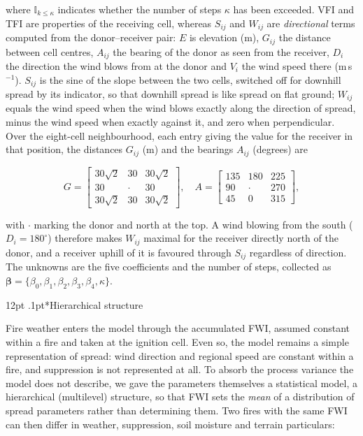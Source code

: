 \documentclass[ResearchPaper,linenum]{CSIRO_LaTeX_Template}
\makeatletter
\renewcommand\subsubsection{\@startsection{subsubsection}{3}{\z@}%
  {12pt \@plus 1pt \@minus 1pt}{.1pt}{\subsubsectionfont}}
\makeatother
\begin{document}
\noindent where $\mathbb{I}_{k \le \kappa}$ indicates whether the number of steps
$\kappa$ has been exceeded. VFI and TFI are properties of the receiving cell, whereas
$S_{ij}$ and $W_{ij}$ are \textit{directional} terms computed from the donor--receiver
pair: $E$ is elevation (m), $G_{ij}$ the distance between cell centres, $A_{ij}$ the
bearing of the donor as seen from the receiver, $D_i$ the direction the wind blows from
at the donor
and $V_i$ the wind speed there (m\,s$^{-1}$). $S_{ij}$ is the sine of the slope between
the two cells, switched off for downhill spread by its indicator, so that downhill
spread is like spread on flat ground; $W_{ij}$ equals the wind speed when the wind blows
exactly along the direction of spread, minus the wind speed when exactly against it,
and zero when perpendicular. Over the eight-cell neighbourhood, each entry giving the
value for the receiver in that position, the distances $G_{ij}$ (m) and the bearings
$A_{ij}$ (degrees) are

\[
    G =
    \begin{bmatrix}
        30 \sqrt{2} & 30 & 30 \sqrt{2} \\
        30 & \cdot & 30 \\
        30 \sqrt{2} & 30 & 30 \sqrt{2}
    \end{bmatrix}, \quad
    A =
    \begin{bmatrix}
        135 & 180 & 225 \\
        90 & \cdot & 270 \\
        45 & 0 & 315
    \end{bmatrix},
\]

\noindent with $\cdot$ marking the donor and north at the top. A wind blowing from the
south ($D_i = 180^\circ$) therefore makes $W_{ij}$ maximal for the receiver directly
north of the donor, and a receiver uphill of it is favoured through $S_{ij}$ regardless
of direction. The unknowns are the five coefficients and the number of steps, collected as
$\boldsymbol{\beta} = \{\beta_0, \beta_1, \beta_2, \beta_3, \beta_4, \kappa\}$.

\subsubsection*{Hierarchical structure}

Fire weather enters the model through the accumulated FWI, assumed constant within a
fire and taken at the ignition cell. Even so, the model remains a simple representation
of spread: wind direction and regional speed are constant within a fire, and
suppression is not represented at all.
To absorb the process variance the model does not describe, we gave the parameters
themselves a statistical model, a hierarchical (multilevel) structure, so that FWI sets
the \emph{mean} of a distribution of spread parameters rather than determining them.
Two fires with the same FWI can then differ in weather, suppression, soil moisture and
terrain particulars:
\end{document}
